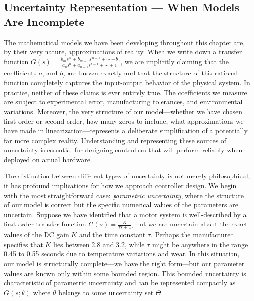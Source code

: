 \subsection{Uncertainty Representation --- When Models Are Incomplete}

The mathematical models we have been developing throughout this chapter are, by their very nature, approximations of reality. When we write down a transfer function $G(s) = \frac{b_ms^m + b_{m-1}s^{m-1} + \cdots + b_0}{a_ns^n + a_{n-1}s^{n-1} + \cdots + a_0}$, we are implicitly claiming that the coefficients $a_i$ and $b_j$ are known exactly and that the structure of this rational function completely captures the input-output behavior of the physical system. In practice, neither of these claims is ever entirely true. The coefficients we measure are subject to experimental error, manufacturing tolerances, and environmental variations. Moreover, the very structure of our model—whether we have chosen first-order or second-order, how many zeros to include, what approximations we have made in linearization—represents a deliberate simplification of a potentially far more complex reality. Understanding and representing these sources of uncertainty is essential for designing controllers that will perform reliably when deployed on actual hardware.

The distinction between different types of uncertainty is not merely philosophical; it has profound implications for how we approach controller design. We begin with the most straightforward case: \emph{parametric uncertainty}, where the structure of our model is correct but the specific numerical values of the parameters are uncertain. Suppose we have identified that a motor system is well-described by a first-order transfer function $G(s) = \frac{K}{\tau s + 1}$, but we are uncertain about the exact values of the DC gain $K$ and the time constant $\tau$. Perhaps the manufacturer specifies that $K$ lies between 2.8 and 3.2, while $\tau$ might be anywhere in the range 0.45 to 0.55 seconds due to temperature variations and wear. In this situation, our model is structurally complete—we have the right form—but our parameter values are known only within some bounded region. This bounded uncertainty is characteristic of parametric uncertainty and can be represented compactly as $G(s; \theta)$ where $\theta$ belongs to some uncertainty set $\Theta$.

